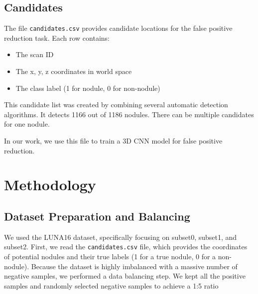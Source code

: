 \documentclass{IEEEtran}
\begin{document}
\subsection{Candidates}
The file \texttt{candidates.csv} provides candidate locations for the false positive reduction task. Each row contains:
\begin{itemize}
    \item The scan ID
    \item The x, y, z coordinates in world space
    \item The class label (1 for nodule, 0 for non-nodule)
\end{itemize}

This candidate list was created by combining several automatic detection algorithms. It detects 1166 out of 1186 nodules. There can be multiple candidates for one nodule.

In our work, we use this file to train a 3D CNN model for false positive reduction.
\section{Methodology}

\subsection{Dataset Preparation and Balancing}
We used the LUNA16 dataset, specifically focusing on subset0, subset1, and subset2. First, we read the \texttt{candidates.csv} file, which provides the coordinates of potential nodules and their true labels (1 for a true nodule, 0 for a non-nodule). Because the dataset is highly imbalanced with a massive number of negative samples, we performed a data balancing step. We kept all the positive samples and randomly selected negative samples to achieve a 1:5 ratio 
\end{document}
